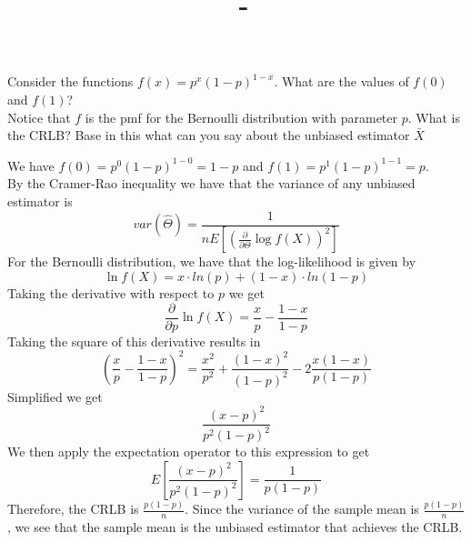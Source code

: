 \documentclass[answers,12pt,addpoints]{exam}
\author{\name}
\title{\course \ - \assignment}
\begin{document}
\maketitle

\begin{questions}
    \question Consider the functions $f(x) = p^x(1-p)^{1-x}$. What are the values of $f(0)$ and $f(1)$?\\
    Notice that $f$ is the pmf for the Bernoulli distribution with parameter $p$. What is the CRLB? Base in this what can you say about the unbiased estimator $\bar{X}$ \\
    \begin{solution}
        We have $f(0) = p^0(1-p)^{1-0} = 1-p$ and $f(1) = p^1(1-p)^{1-1} = p$. \\
        By the Cramer-Rao inequality we have that the variance of any unbiased estimator is $$ var(\hat{\Theta}) = \frac{1}{n E[(\frac{\partial}{\partial \Theta} \log f(X))^2]}$$
        For the Bernoulli distribution, we have that the log-likelihood is given by $$\ln f(X) = x \cdot ln(p) + (1-x) \cdot ln(1-p) $$
        Taking the derivative with respect to $p$ we get $$\frac{\partial}{\partial p} \ln f(X) = \frac{x}{p} - \frac{1-x}{1-p}$$
        Taking the square of this derivative results in $$\left(\frac{x}{p} - \frac{1-x}{1-p}\right)^2 = \frac{x^2}{p^2} + \frac{(1-x)^2}{(1-p)^2} - 2\frac{x(1-x)}{p(1-p)}$$
        Simplified we get $$\frac{(x-p)^2}{p^2(1-p)^2}$$
        We then apply the expectation operator to this expression to get $$E\left[\frac{(x-p)^2}{p^2(1-p)^2}\right] = \frac{1}{p(1-p)}$$
        Therefore, the CRLB is $\frac{p(1-p)}{n}$. Since the variance of the sample mean is $\frac{p(1-p)}{n}$, we see that the sample mean is the unbiased estimator that achieves the CRLB.
    \end{solution}
\end{questions}
\end{document}
